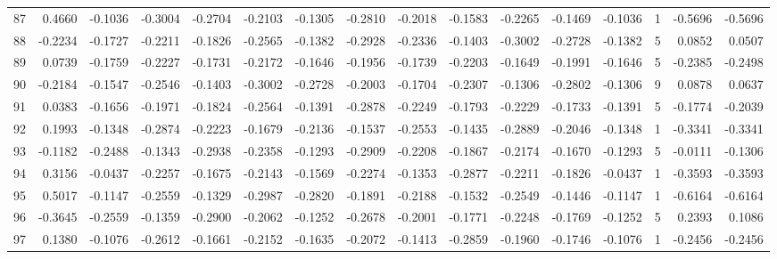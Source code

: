 \begin{tabular}{lrrrrrrrrrrrrrrr}
87  &      0.4660 & -0.1036 & -0.3004 & -0.2704 & -0.2103 & -0.1305 & -0.2810 & -0.2018 & -0.1583 & -0.2265 &  -0.1469 &    -0.1036 &      1 &                   -0.5696 &                    -0.5696 \\
88  &     -0.2234 & -0.1727 & -0.2211 & -0.1826 & -0.2565 & -0.1382 & -0.2928 & -0.2336 & -0.1403 & -0.3002 &  -0.2728 &    -0.1382 &      5 &                    0.0852 &                     0.0507 \\
89  &      0.0739 & -0.1759 & -0.2227 & -0.1731 & -0.2172 & -0.1646 & -0.1956 & -0.1739 & -0.2203 & -0.1649 &  -0.1991 &    -0.1646 &      5 &                   -0.2385 &                    -0.2498 \\
90  &     -0.2184 & -0.1547 & -0.2546 & -0.1403 & -0.3002 & -0.2728 & -0.2003 & -0.1704 & -0.2307 & -0.1306 &  -0.2802 &    -0.1306 &      9 &                    0.0878 &                     0.0637 \\
91  &      0.0383 & -0.1656 & -0.1971 & -0.1824 & -0.2564 & -0.1391 & -0.2878 & -0.2249 & -0.1793 & -0.2229 &  -0.1733 &    -0.1391 &      5 &                   -0.1774 &                    -0.2039 \\
92  &      0.1993 & -0.1348 & -0.2874 & -0.2223 & -0.1679 & -0.2136 & -0.1537 & -0.2553 & -0.1435 & -0.2889 &  -0.2046 &    -0.1348 &      1 &                   -0.3341 &                    -0.3341 \\
93  &     -0.1182 & -0.2488 & -0.1343 & -0.2938 & -0.2358 & -0.1293 & -0.2909 & -0.2208 & -0.1867 & -0.2174 &  -0.1670 &    -0.1293 &      5 &                   -0.0111 &                    -0.1306 \\
94  &      0.3156 & -0.0437 & -0.2257 & -0.1675 & -0.2143 & -0.1569 & -0.2274 & -0.1353 & -0.2877 & -0.2211 &  -0.1826 &    -0.0437 &      1 &                   -0.3593 &                    -0.3593 \\
95  &      0.5017 & -0.1147 & -0.2559 & -0.1329 & -0.2987 & -0.2820 & -0.1891 & -0.2188 & -0.1532 & -0.2549 &  -0.1446 &    -0.1147 &      1 &                   -0.6164 &                    -0.6164 \\
96  &     -0.3645 & -0.2559 & -0.1359 & -0.2900 & -0.2062 & -0.1252 & -0.2678 & -0.2001 & -0.1771 & -0.2248 &  -0.1769 &    -0.1252 &      5 &                    0.2393 &                     0.1086 \\
97  &      0.1380 & -0.1076 & -0.2612 & -0.1661 & -0.2152 & -0.1635 & -0.2072 & -0.1413 & -0.2859 & -0.1960 &  -0.1746 &    -0.1076 &      1 &                   -0.2456 &                    -0.2456 \\

\end{tabular}
